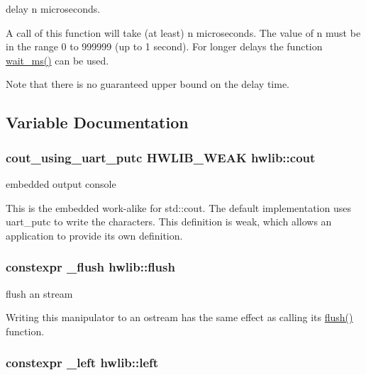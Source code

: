 delay n microseconds. 

A call of this function will take (at least) n microseconds. The value of n must be in the range 0 to 999999 (up to 1 second). For longer delays the function \hyperlink{namespacehwlib_a6119aa5d3034176aa1515ef4bb193044}{wait\+\_\+ms()} can be used.

Note that there is no guaranteed upper bound on the delay time. 

\subsection{Variable Documentation}
\subsubsection[{\texorpdfstring{cout}{cout}}]{\setlength{\rightskip}{0pt plus 5cm}cout\+\_\+using\+\_\+uart\+\_\+putc {\bf H\+W\+L\+I\+B\+\_\+\+W\+E\+AK} hwlib\+::cout}\hypertarget{namespacehwlib_ac985c212834e4eb219aedede6efff2dc}{}\label{namespacehwlib_ac985c212834e4eb219aedede6efff2dc}


embedded output console 

This is the embedded work-\/alike for std\+::cout. The default implementation uses uart\+\_\+putc to write the characters. This definition is weak, which allows an application to provide its own definition. 
\subsubsection[{\texorpdfstring{flush}{flush}}]{\setlength{\rightskip}{0pt plus 5cm}constexpr {\bf \+\_\+flush} hwlib\+::flush}\hypertarget{namespacehwlib_a648fe94ca9899747a632c23f97007732}{}\label{namespacehwlib_a648fe94ca9899747a632c23f97007732}


flush an stream 

Writing this manipulator to an ostream has the same effect as calling its \hyperlink{namespacehwlib_a648fe94ca9899747a632c23f97007732}{flush()} function. 
\subsubsection[{\texorpdfstring{left}{left}}]{\setlength{\rightskip}{0pt plus 5cm}constexpr {\bf \+\_\+left} hwlib\+::left}\hypertarget{namespacehwlib_a7d9a4ef3e66da75048c5b3e67cf401d8}{}\label{namespacehwlib_a7d9a4ef3e66da75048c5b3e67cf401d8}


